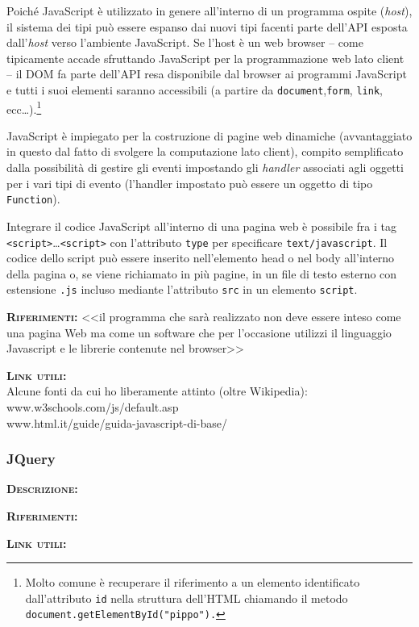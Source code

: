 \begin{description}
  Poiché JavaScript è utilizzato in genere all'interno di un programma ospite (\textit{host}), il sistema dei tipi può essere espanso dai nuovi tipi facenti parte dell'API esposta dall'\textit{host} verso l'ambiente JavaScript. Se l'host è un web browser -- come tipicamente accade sfruttando JavaScript per la programmazione web lato client --  il DOM fa parte dell'API resa disponibile dal browser ai programmi JavaScript e tutti i suoi elementi saranno accessibili (a partire da \texttt{document},\texttt{form}, \texttt{link}, ecc\dots).\footnote{%
    Molto comune è recuperare il riferimento a un elemento identificato dall'attributo \texttt{id} nella struttura dell'HTML chiamando il metodo \texttt{document.getElementById("pippo").}
  }
  
  JavaScript è impiegato per la costruzione di pagine web dinamiche (avvantaggiato in questo dal fatto di svolgere la computazione lato client), compito semplificato dalla possibilità di gestire gli eventi impostando gli \textit{handler} associati agli oggetti per i vari tipi di evento (l'handler impostato può essere un oggetto di tipo \texttt{Function}).
  
  Integrare il codice JavaScript all'interno di una pagina web è possibile fra i tag \texttt{<script>}\dots\texttt{<script>} con l'attributo \texttt{type} per specificare \texttt{text/javascript}. Il codice dello script può essere inserito nell'elemento head o nel body all'interno della pagina o, se viene richiamato in più pagine, in un file di testo esterno con estensione \texttt{.js} incluso mediante l'attributo \texttt{src} in un elemento \texttt{script}.
  
	\item{\scshape\bfseries Riferimenti:}
  <<il programma che sarà realizzato non deve essere inteso come una pagina Web ma come un software che per l'occasione utilizzi il linguaggio Javascript e le librerie contenute nel browser>>

	\item{\scshape\bfseries Link utili:}\\
  Alcune fonti da cui ho liberamente attinto (oltre Wikipedia):\\
  www.w3schools.com/js/default.asp\\
  www.html.it/guide/guida-javascript-di-base/
\end{description}

\subsubsection{JQuery}
\begin{description}
	\item{\scshape\bfseries Descrizione:}
	\item{\scshape\bfseries Riferimenti:} 
	\item{\scshape\bfseries Link utili:}  
\end{description}

